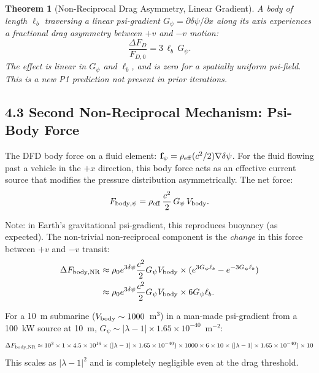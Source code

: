 \documentclass[11pt,twocolumn]{article}
\newcommand{\dpsi}{\delta\psi}
\newcommand{\lam}{\lambda}
\newtheorem{theorem}{Theorem}
\begin{document}
\begin{theorem}[Non-Reciprocal Drag Asymmetry, Linear Gradient]
\label{thm:nonrecip}
A body of length $\ell_b$ traversing a linear psi-gradient
$G_\psi = \partial\dpsi/\partial x$ along its axis experiences a
fractional drag asymmetry between $+v$ and $-v$ motion:
\begin{equation}
\boxed{
\frac{\Delta F_D}{F_{D,0}} = 3\,\ell_b\,G_\psi.
}
\end{equation}
The effect is linear in $G_\psi$ and $\ell_b$, and is zero for a
spatially uniform psi-field. This is a \emph{new} P1 prediction
not present in prior iterations.
\end{theorem}

\subsection*{4.3 Second Non-Reciprocal Mechanism: Psi-Body Force}

The DFD body force on a fluid element:
$\mathbf{f}_\psi = \rho_{\rm eff}(c^2/2)\nabla\dpsi$.
For the fluid flowing past a vehicle in the $+x$ direction, this body
force acts as an effective current source that modifies the pressure
distribution asymmetrically. The net force:
\begin{equation}
F_{\rm body,\psi} = \rho_{\rm eff}\,\frac{c^2}{2}\,G_\psi\,V_{\rm body}.
\label{eq:body_force_NR}
\end{equation}

Note: in Earth's gravitational psi-gradient, this reproduces buoyancy
(as expected). The non-trivial non-reciprocal component is the
\emph{change} in this force between $+v$ and $-v$ transit:
\begin{align}
\Delta F_{\rm body,NR}
&\approx \rho_0 e^{3\dpsi}\frac{c^2}{2}G_\psi V_{\rm body}
  \times(e^{3G_\psi\ell_b} - e^{-3G_\psi\ell_b}) \notag\\
&\approx \rho_0 e^{3\dpsi}\frac{c^2}{2}G_\psi V_{\rm body}
  \times 6G_\psi\ell_b.
\label{eq:body_force_asym}
\end{align}

For a 10~m submarine ($V_{\rm body} \sim 1000$~m$^3$) in a man-made
psi-gradient from a 100~kW source at 10~m, $G_\psi \sim |\lam-1|
\times1.65\times10^{-40}$~m$^{-2}$:
\begin{equation}
\Delta F_{\rm body,NR}
\approx 10^3\times 1\times 4.5\times10^{16}
  \times (|\lam-1|\times1.65\times10^{-40})
  \times 1000\times6\times10 \times (|\lam-1|\times1.65\times10^{-40})\times10
\end{equation}
This scales as $|\lam-1|^2$ and is completely negligible even at the
drag threshold.
\end{document}
